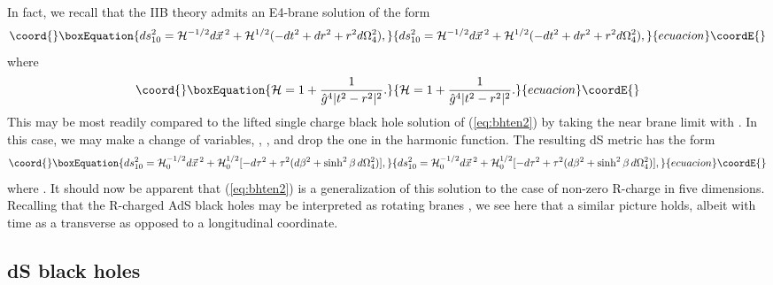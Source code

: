 \documentclass[a4paper,12pt]{article}
\providecommand{\fft}[2]{{\frac{#1}{#2}}}
\begin{document}
In fact, we recall that the IIB\myHighlight{$^*$}\coordHE{} theory admits an E4-brane solution of
the form \cite{Hull:1998vg}
%
\begin{equation}\coord{}\boxEquation{
ds_{10}^2={\cal H}^{-1/2}d\vec x\,^2+{\cal H}^{1/2}(-dt^2+dr^2+r^2d\Omega_4^2),
}{
ds_{10}^2={\cal H}^{-1/2}d\vec x\,^2+{\cal H}^{1/2}(-dt^2+dr^2+r^2d\Omega_4^2),
}{ecuacion}\coordE{}\end{equation}
%
where
%
\begin{equation}\coord{}\boxEquation{
{\cal H}=1+\fft1{\hat g^4|t^2-r^2|^2}.
}{
{\cal H}=1+\fft1{\hat g^4|t^2-r^2|^2}.
}{ecuacion}\coordE{}\end{equation}
%
This may be most readily compared to the lifted single charge black hole
solution of (\ref{eq:bhten2}) by taking the near brane limit \coordHE{} with
\coordHE{}.  In this case, we may make a change of variables,
\coordHE{}, \coordHE{}, and drop the one in the harmonic
function.  The resulting dS\coordHE{} metric has the form
%
\begin{equation}\coord{}\boxEquation{
ds_{10}^2={\cal H}_0^{-1/2}d\vec x\,^2+{\cal H}_0^{1/2}[-d\tau^2
+\tau^2(d\beta^2+\sinh^2\beta\,d\Omega_4^2)],
}{
ds_{10}^2={\cal H}_0^{-1/2}d\vec x\,^2+{\cal H}_0^{1/2}[-d\tau^2
+\tau^2(d\beta^2+\sinh^2\beta\,d\Omega_4^2)],
}{ecuacion}\coordE{}\end{equation}
%
where \coordHE{}.  It should now be apparent that
(\ref{eq:bhten2}) is a generalization of this solution to the case of
non-zero R-charge in five dimensions.  Recalling that the R-charged AdS
black holes may be interpreted as rotating branes \cite{Cvetic}, we see
here that a similar picture holds, albeit with time as a transverse as
opposed to a longitudinal coordinate.

\subsection{\coordHE{} dS black holes}
\end{document}

